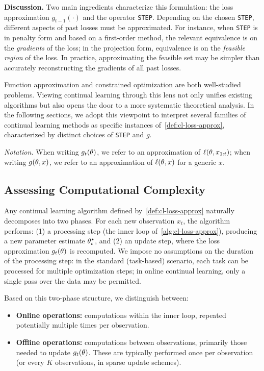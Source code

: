\documentclass[10pt]{article} %
\begin{document}
\vspace{0.5em}
\noindent\textbf{Discussion.}
Two main ingredients characterize this formulation: the loss approximation $g_{t-1}(\cdot)$ and the operator \texttt{STEP}.  
Depending on the chosen \texttt{STEP}, different aspects of past losses must be approximated.  
For instance, when \texttt{STEP} is in penalty form and based on a first-order method, the relevant equivalence is on the \emph{gradients} of the loss;  
in the projection form, equivalence is on the \emph{feasible region} of the loss.  
In practice, approximating the feasible set may be simpler than accurately reconstructing the gradients of all past losses.

Function approximation and constrained optimization are both well-studied problems.  
Viewing continual learning through this lens not only unifies existing algorithms but also opens the door to a more systematic theoretical analysis.  
In the following sections, we adopt this viewpoint to interpret several families of continual learning methods as specific instances of~\cref{def:cl-loss-approx}, characterized by distinct choices of \texttt{STEP} and $g$.

\noindent\emph{Notation.}  
When writing $g_t(\theta)$, we refer to an approximation of $\ell(\theta, x_{1:t})$;  
when writing $g(\theta, x)$, we refer to an approximation of $\ell(\theta, x)$ for a generic $x$.

\subsection{Assessing Computational Complexity}
Any continual learning algorithm defined by~\cref{def:cl-loss-approx} naturally decomposes into two phases.  
For each new observation $x_t$, the algorithm performs:
    (1) a {processing step} (the inner loop of~\cref{alg:cl-loss-approx}), producing a new parameter estimate $\theta_t^\star$, and  
    (2) an {update step}, where the loss approximation $g_t(\theta)$ is recomputed.
We impose no assumptions on the duration of the processing step: in the standard (task-based) scenario, each task can be processed for multiple optimization steps; in online continual learning, only a single pass over the data may be permitted.

\vspace{0.5em}
Based on this two-phase structure, we distinguish between:
\begin{itemize}
    \item \textbf{Online operations:} computations within the inner loop, repeated potentially multiple times per observation.
    \item \textbf{Offline operations:} computations between observations, primarily those needed to update $g_t(\theta)$.  
    These are typically performed once per observation (or every $K$ observations, in sparse update schemes).
\end{itemize}
\end{document}
